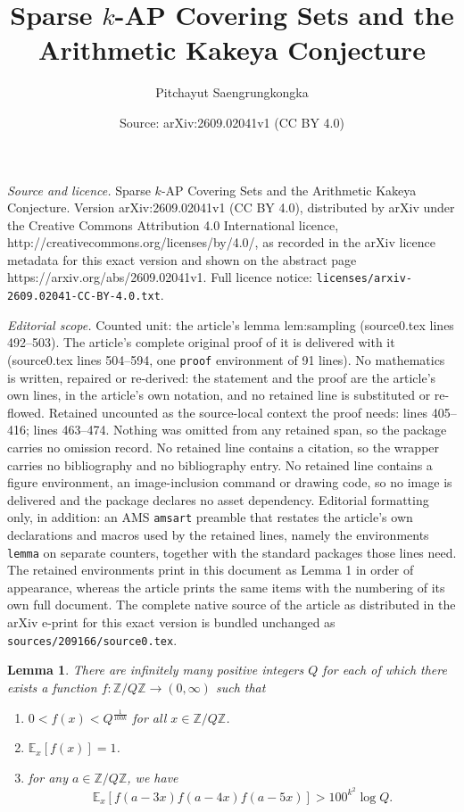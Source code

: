 \documentclass[10pt,a4paper]{amsart}
\title{Sparse $k$-AP Covering Sets and the Arithmetic Kakeya Conjecture}
\author{Pitchayut Saengrungkongka}
\date{Source: arXiv:2609.02041v1 (CC BY 4.0)}
\newtheorem{lemma}{Lemma}
\newcommand{\ZZ}{\mathbb Z}
\begin{document}
\maketitle

\noindent\emph{Source and licence.} Sparse $k$-AP Covering Sets and the Arithmetic Kakeya Conjecture. Version arXiv:2609.02041v1 (CC BY 4.0), distributed by arXiv under the Creative Commons Attribution 4.0 International licence, http://creativecommons.org/licenses/by/4.0/, as recorded in the arXiv licence metadata for this exact version and shown on the abstract page https://arxiv.org/abs/2609.02041v1. Full licence notice: \texttt{licenses/arxiv-2609.02041-CC-BY-4.0.txt}.\par\smallskip

\noindent\textit{Editorial scope.} Counted unit: the article's lemma lem:sampling (source0.tex lines 492--503). The article's complete original proof of it is delivered with it (source0.tex lines 504--594, one \texttt{proof} environment of 91 lines). No mathematics is written, repaired or re-derived: the statement and the proof are the article's own lines, in the article's own notation, and no retained line is substituted or re-flowed.  Retained uncounted as the source-local context the proof needs: lines 405--416; lines 463--474.  Nothing was omitted from any retained span, so the package carries no omission record.  No retained line contains a citation, so the wrapper carries no bibliography and no bibliography entry.  No retained line contains a figure environment, an image-inclusion command or drawing code, so no image is delivered and the package declares no asset dependency.  Editorial formatting only, in addition: an AMS \texttt{amsart} preamble that restates the article's own declarations and macros used by the retained lines, namely the environments \texttt{lemma} on separate counters, together with the standard packages those lines need.  The retained environments print in this document as Lemma 1 in order of appearance, whereas the article prints the same items with the numbering of its own full document.  The complete native source of the article as distributed in the arXiv e-print for this exact version is bundled unchanged as \texttt{sources/209166/source0.tex}.
\begin{lemma}
\label{lem:crt}
There are infinitely many positive integers $Q$ 
for each of which there exists 
a function $f : \ZZ/Q\ZZ \to (0,\infty)$ such that 
\begin{enumerate}[label=(\alph*)]
\item $0<f(x) < Q^{\frac 1{100k}}$ for all $x\in \ZZ/Q\ZZ$.
\item $\mathbb E_x[f(x)] = 1$.
\item for any $a\in \ZZ/Q\ZZ$, we have
$$\mathbb E_x[f(a-3x)f(a-4x)f(a-5x)] > 100^{k^2}\log Q.$$
\end{enumerate}
\end{lemma}
\end{document}
